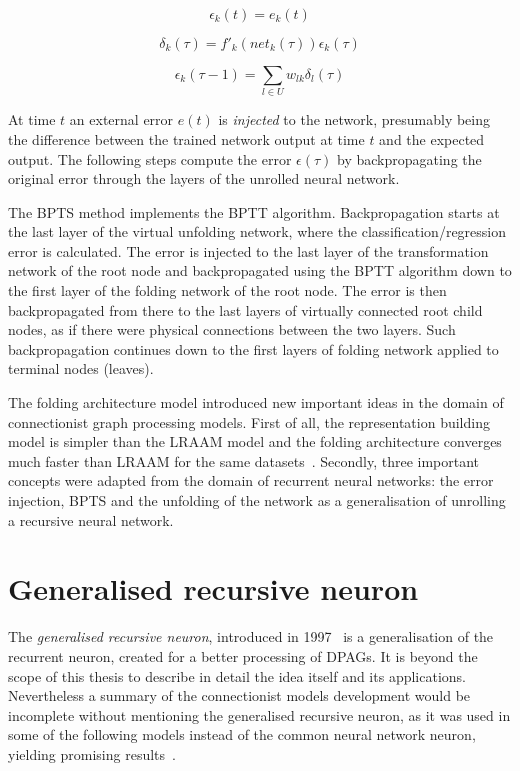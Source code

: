 \begin{equation}
\epsilon_k(t) = e_k(t)
\label{eq:bptt_epsilon}
\end{equation}

\begin{equation}
\delta_k(\tau) = f'_k(net_k(\tau))\epsilon_k(\tau)
\label{eq:bptt_delta}
\end{equation}

\begin{equation}
\epsilon_k(\tau - 1) = \sum_{l \in U} w_{lk} \delta_l(\tau)
\label{eq:bptt_summaric}
\end{equation}

\noindent At time $t$ an external error $e(t)$ is \emph{injected} to the network, presumably being the difference between the trained network output at time $t$ and the expected output. The following steps compute the error $\epsilon(\tau)$ by backpropagating the original error through the layers of the unrolled neural network.

The BPTS method implements the BPTT algorithm. Backpropagation starts at the last layer of the virtual unfolding network, where the classification/regression error is calculated. The error is injected to the last layer of the transformation network of the root node and backpropagated using the BPTT algorithm down to the first layer of the folding network of the root node. The error is then backpropagated from there to the last layers of virtually connected root child nodes, as if there were physical connections between the two layers. Such backpropagation continues down to the first layers of folding network applied to terminal nodes (leaves).

The folding architecture model introduced new important ideas in the domain of connectionist graph processing models. First of all, the representation building model is simpler than the LRAAM model and the folding architecture converges much faster than LRAAM for the same datasets~\cite{goller1996learning}. Secondly, three important concepts were adapted from the domain of recurrent neural networks: the error injection, BPTS and the unfolding of the network as a generalisation of unrolling a recursive neural network.

\section{Generalised recursive neuron}
The \emph{generalised recursive neuron}, introduced in 1997~\cite{sperduti1997supervised} is a generalisation of the recurrent neuron, created for a better processing of DPAGs. It is beyond the scope of this thesis to describe in detail the idea itself and its applications. Nevertheless a summary of the connectionist models development would be incomplete without mentioning the generalised recursive neuron, as it was used in some of the following models instead of the common neural network neuron, yielding promising results~\cite{frasconi1998general}.

